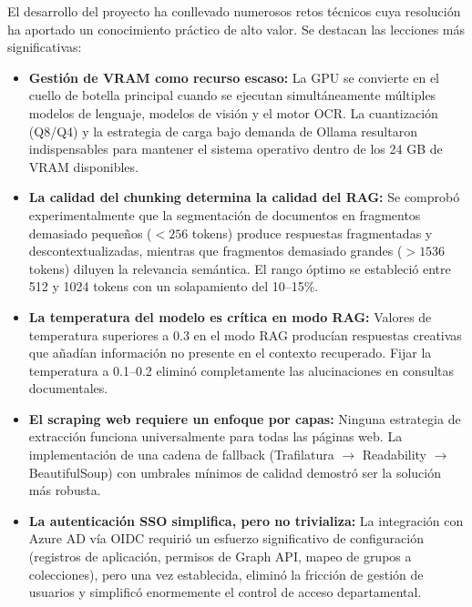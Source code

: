 El desarrollo del proyecto ha conllevado numerosos retos técnicos cuya resolución ha aportado un conocimiento práctico de alto valor. Se destacan las lecciones más significativas:

\begin{itemize}
    \item \textbf{Gestión de VRAM como recurso escaso:} La GPU se convierte en el cuello de botella principal cuando se ejecutan simultáneamente múltiples modelos de lenguaje, modelos de visión y el motor OCR. La cuantización (Q8/Q4) y la estrategia de carga bajo demanda de Ollama resultaron indispensables para mantener el sistema operativo dentro de los 24 GB de VRAM disponibles.

    \item \textbf{La calidad del chunking determina la calidad del RAG:} Se comprobó experimentalmente que la segmentación de documentos en fragmentos demasiado pequeños ($< 256$ tokens) produce respuestas fragmentadas y descontextualizadas, mientras que fragmentos demasiado grandes ($> 1536$ tokens) diluyen la relevancia semántica. El rango óptimo se estableció entre 512 y 1024 tokens con un solapamiento del 10--15\%.

    \item \textbf{La temperatura del modelo es crítica en modo RAG:} Valores de temperatura superiores a 0.3 en el modo RAG producían respuestas creativas que añadían información no presente en el contexto recuperado. Fijar la temperatura a 0.1--0.2 eliminó completamente las alucinaciones en consultas documentales.

    \item \textbf{El scraping web requiere un enfoque por capas:} Ninguna estrategia de extracción funciona universalmente para todas las páginas web. La implementación de una cadena de fallback (Trafilatura $\rightarrow$ Readability $\rightarrow$ BeautifulSoup) con umbrales mínimos de calidad demostró ser la solución más robusta.

    \item \textbf{La autenticación SSO simplifica, pero no trivializa:} La integración con Azure AD vía OIDC requirió un esfuerzo significativo de configuración (registros de aplicación, permisos de Graph API, mapeo de grupos a colecciones), pero una vez establecida, eliminó la fricción de gestión de usuarios y simplificó enormemente el control de acceso departamental.
\end{itemize}

